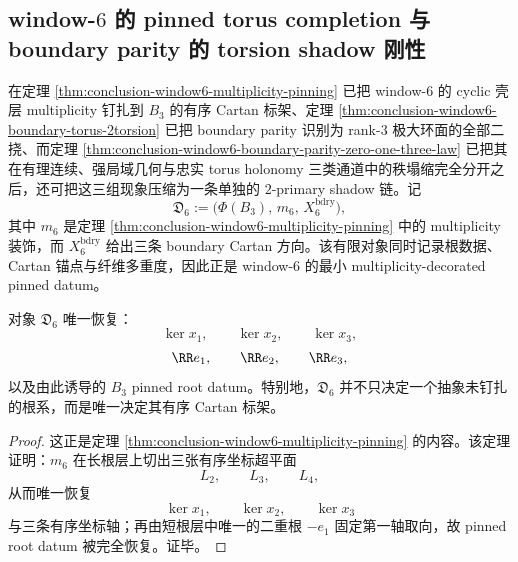 \subsection{window-\texorpdfstring{$6$}{6} 的 pinned torus completion 与 boundary parity 的 torsion shadow 刚性}\label{subsec:conclusion-window6-pinned-torus-torsion-shadow-rigidity}

在定理 \ref{thm:conclusion-window6-multiplicity-pinning} 已把 window-\(6\) 的 cyclic 壳层 multiplicity 钉扎到 \(B_3\) 的有序 Cartan 标架、定理 \ref{thm:conclusion-window6-boundary-torus-2torsion} 已把 boundary parity 识别为 rank-\(3\) 极大环面的全部二挠、而定理 \ref{thm:conclusion-window6-boundary-parity-zero-one-three-law} 已把其在有理连续、强局域几何与忠实 torus holonomy 三类通道中的秩塌缩完全分开之后，还可把这三组现象压缩为一条单独的 \(2\)-primary shadow 链。记
\[
\mathfrak D_6
:=
\bigl(\Phi(B_3),\,m_6,\,X_6^{\mathrm{bdry}}\bigr),
\]
其中 \(m_6\) 是定理 \ref{thm:conclusion-window6-multiplicity-pinning} 中的 multiplicity 装饰，而 \(X_6^{\mathrm{bdry}}\) 给出三条 boundary Cartan 方向。该有限对象同时记录根数据、Cartan 锚点与纤维多重度，因此正是 window-\(6\) 的最小 multiplicity-decorated pinned datum。

\begin{proposition}\label{prop:conclusion-window6-multiplicity-decorated-pinned-datum-rigidity}
对象 \(\mathfrak D_6\) 唯一恢复：
\[
\ker x_1,\qquad \ker x_2,\qquad \ker x_3,
\]
\[
\RR e_1,\qquad \RR e_2,\qquad \RR e_3,
\]
以及由此诱导的 \(B_3\) pinned root datum。特别地，\(\mathfrak D_6\) 并不只决定一个抽象未钉扎的根系，而是唯一决定其有序 Cartan 标架。
\end{proposition}
\begin{proof}
这正是定理 \ref{thm:conclusion-window6-multiplicity-pinning} 的内容。该定理证明：\(m_6\) 在长根层上切出三张有序坐标超平面
\[
L_2,\qquad L_3,\qquad L_4,
\]
从而唯一恢复
\[
\ker x_1,\qquad \ker x_2,\qquad \ker x_3
\]
与三条有序坐标轴；再由短根层中唯一的二重根 \(-e_1\) 固定第一轴取向，故 pinned root datum 被完全恢复。证毕。
\end{proof}

